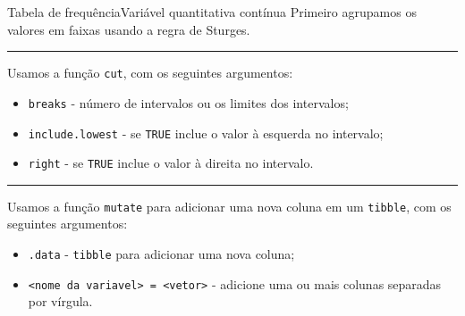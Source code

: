 \documentclass[
  10pt,
  ignorenonframetext,
]{beamer}
\providecommand{\tightlist}{%
  \setlength{\itemsep}{0pt}\setlength{\parskip}{0pt}}\usepackage{longtable,booktabs,array}
\newcommand*{\regrafina}{\rule{\textwidth}{0.5pt}}
\begin{document}
\begin{frame}[fragile]{Tabela de frequência\newline Variável
quantitativa contínua}
\protect\hypertarget{tabela-de-frequuxeanciavariuxe1vel-quantitativa-contuxednua-1}{}
Primeiro agrupamos os valores em faixas usando a regra de Sturges.

\regrafina

Usamos a função \texttt{cut}, com os seguintes argumentos:

\begin{itemize}
\tightlist
\item
  \texttt{breaks} - número de intervalos ou os limites dos intervalos;
\item
  \texttt{include.lowest} - se \texttt{TRUE} inclue o valor à esquerda
  no intervalo;
\item
  \texttt{right} - se \texttt{TRUE} inclue o valor à direita no
  intervalo.
\end{itemize}

\regrafina

Usamos a função \texttt{mutate} para adicionar uma nova coluna em um
\texttt{tibble}, com os seguintes argumentos:

\begin{itemize}
\tightlist
\item
  \texttt{.data} - \texttt{tibble} para adicionar uma nova coluna;
\item
  \texttt{\textless{}nome\ da\ variavel\textgreater{}\ =\ \textless{}vetor\textgreater{}}
  - adicione uma ou mais colunas separadas por vírgula.
\end{itemize}
\end{frame}
\end{document}
